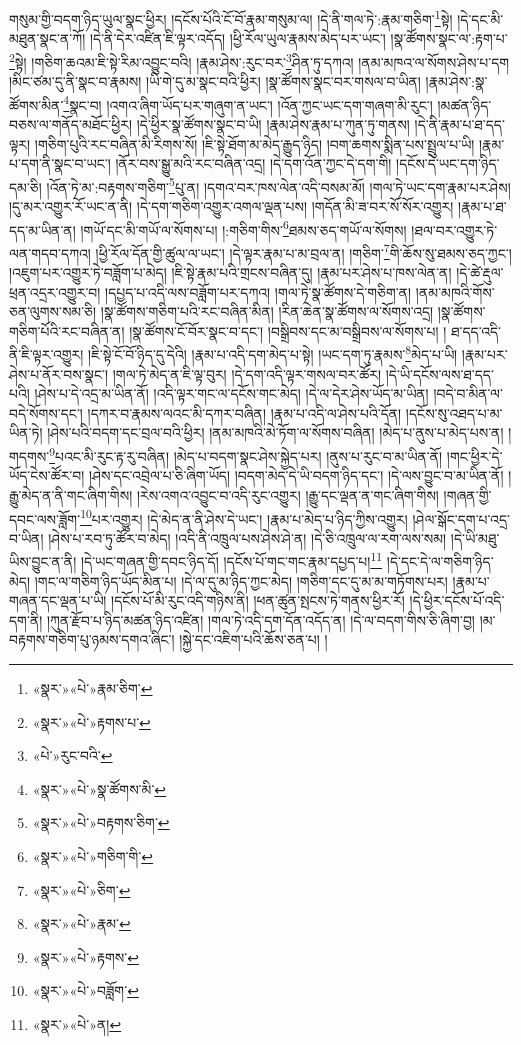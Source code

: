 གསུམ་གྱི་བདག་ཉིད་ཡུལ་སྣང་ཕྱིར། །དངོས་པོའི་ངོ་བོ་རྣམ་གསུམ་ལ། །དེ་ནི་གལ་ཏེ་:རྣམ་གཅིག་\footnote{«སྣར་»«པེ་»རྣམ་ཅིག་}སྟེ། །དེ་དང་མི་མཐུན་སྣང་ན་ཀོ། །དེ་ནི་དེར་འཛིན་ཇི་ལྟར་འདོད། །ཕྱི་རོལ་ཡུལ་རྣམས་མེད་པར་ཡང་། །སྣ་ཚོགས་སྣང་ལ་:རྟག་པ་\footnote{«སྣར་»«པེ་»རྟགས་པ་}སྟེ། །གཅིག་ཆའམ་ཇི་སྟེ་རིམ་འབྱུང་བའི། །རྣམ་ཤེས་:རུང་བར་\footnote{«པེ་»རུང་བའི་}ཤིན་ཏུ་དཀའ། །ནམ་མཁའ་ལ་སོགས་ཤེས་པ་དག །མིང་ཙམ་དུ་ནི་སྣང་བ་རྣམས། །ཡི་གེ་དུ་མ་སྣང་བའི་ཕྱིར། །སྣ་ཚོགས་སྣང་བར་གསལ་བ་ཡིན། །རྣམ་ཤེས་:སྣ་ཚོགས་མིན་\footnote{«སྣར་»«པེ་»སྣ་ཚོགས་མི་}སྣང་བ། །འགའ་ཞིག་ཡོད་པར་གཞུག་ན་ཡང་། །འོན་ཀྱང་ཡང་དག་གཞག་མི་རུང་། །མཚན་ཉིད་བཅས་ལ་གནོད་མཐོང་ཕྱིར། །དེ་ཕྱིར་སྣ་ཚོགས་སྣང་བ་ཡི། །རྣམ་ཤེས་རྣམ་པ་ཀུན་ཏུ་གནས། །དེ་ནི་རྣམ་པ་ཐ་དད་ལྟར། །གཅིག་པུའི་རང་བཞིན་མི་རིགས་སོ། །ཇི་སྟེ་ཐོག་མ་མེད་རྒྱུད་ཉིད། །བག་ཆགས་སྨིན་པས་སྤྲུལ་པ་ཡི། །རྣམ་པ་དག་ནི་སྣང་བ་ཡང་། །ནོར་བས་སྒྱུ་མའི་རང་བཞིན་འདྲ། །དེ་དག་འོན་ཀྱང་དེ་དག་གི། །དངོས་དེ་ཡང་དག་ཉིད་དམ་ཅི། །འོན་ཏེ་མ་:བརྟགས་གཅིག་\footnote{«སྣར་»«པེ་»བརྟགས་ཅིག་}པུ་ན། །དགའ་བར་ཁས་ལེན་འདི་བསམ་མོ། །གལ་ཏེ་ཡང་དག་རྣམ་པར་ཤེས། །དུ་མར་འགྱུར་རོ་ཡང་ན་ནི། །དེ་དག་གཅིག་འགྱུར་འགལ་ལྡན་པས། །གདོན་མི་ཟ་བར་སོ་སོར་འགྱུར། །རྣམ་པ་ཐ་དད་མ་ཡིན་ན། །གཡོ་དང་མི་གཡོ་ལ་སོགས་པ། །:གཅིག་གིས་\footnote{«སྣར་»«པེ་»གཅིག་གི་}ཐམས་ཅད་གཡོ་ལ་སོགས། །ཐལ་བར་འགྱུར་ཏེ་ལན་གདབ་དཀའ། །ཕྱི་རོལ་དོན་གྱི་ཚུལ་ལ་ཡང་། །དེ་ལྟར་རྣམ་པ་མ་བྲལ་ན། །གཅིག་\footnote{«སྣར་»«པེ་»ཅིག་}གི་ཆོས་སུ་ཐམས་ཅད་ཀྱང་། །འཇུག་པར་འགྱུར་ཏེ་བཟློག་པ་མེད། །ཇི་སྟེ་རྣམ་པའི་གྲངས་བཞིན་དུ། །རྣམ་པར་ཤེས་པ་ཁས་ལེན་ན། །དེ་ཚེ་རྡུལ་ཕྲན་འདྲར་འགྱུར་བ། །དཔྱད་པ་འདི་ལས་བཟློག་པར་དཀའ། །གལ་ཏེ་སྣ་ཚོགས་དེ་གཅིག་ན། །ནམ་མཁའི་གོས་ཅན་ལུགས་སམ་ཅི། །སྣ་ཚོགས་གཅིག་པའི་རང་བཞིན་མིན། །རིན་ཆེན་སྣ་ཚོགས་ལ་སོགས་འདྲ། །སྣ་ཚོགས་གཅིག་པོའི་རང་བཞིན་ན། །སྣ་ཚོགས་ངོ་བོར་སྣང་བ་དང་། །བསྒྲིབས་དང་མ་བསྒྲིབས་ལ་སོགས་པ། །
ཐ་དད་འདི་ནི་ཇི་ལྟར་འགྱུར། །ཇི་སྟེ་ངོ་བོ་ཉིད་དུ་དེའི། །རྣམ་པ་འདི་དག་མེད་པ་སྟེ། །ཡང་དག་ཏུ་རྣམས་\footnote{«སྣར་»«པེ་»རྣམ་}མེད་པ་ཡི། །རྣམ་པར་ཤེས་པ་ནོར་བས་སྣང་། །གལ་ཏེ་མེད་ན་ཇི་ལྟ་བུར། །དེ་དག་འདི་ལྟར་གསལ་བར་ཚོར། །དེ་ཡི་དངོས་ལས་ཐ་དད་པའི། །ཤེས་པ་དེ་འདྲ་མ་ཡིན་ནོ། །འདི་ལྟར་གང་ལ་དངོས་གང་མེད། །དེ་ལ་དེར་ཤེས་ཡོད་མ་ཡིན། །བདེ་བ་མིན་ལ་བདེ་སོགས་དང་། །དཀར་བ་རྣམས་ལའང་མི་དཀར་བཞིན། །རྣམ་པ་འདི་ལ་ཤེས་པའི་དོན། །དངོས་སུ་འཐད་པ་མ་ཡིན་ཏེ། །ཤེས་པའི་བདག་དང་བྲལ་བའི་ཕྱིར། །ནམ་མཁའི་མེ་ཏོག་ལ་སོགས་བཞིན། །མེད་པ་ནུས་པ་མེད་པས་ན། །གདགས་\footnote{«སྣར་»«པེ་»རྟགས་}པའང་མི་རུང་རྟ་རུ་བཞིན། །མེད་པ་བདག་སྣང་ཤེས་སྐྱེད་པར། །ནུས་པ་རུང་བ་མ་ཡིན་ནོ། །གང་ཕྱིར་དེ་ཡོད་ངེས་ཚོར་བ། །ཤེས་དང་འབྲེལ་པ་ཅི་ཞིག་ཡོད། །བདག་མེད་དེ་ཡི་བདག་ཉིད་དང་། །དེ་ལས་བྱུང་བ་མ་ཡིན་ནོ། །རྒྱུ་མེད་ན་ནི་གང་ཞིག་གིས། །རེས་འགའ་འབྱུང་བ་འདི་རུང་འགྱུར། །རྒྱུ་དང་ལྡན་ན་གང་ཞིག་གིས། །གཞན་གྱི་དབང་ལས་ཟློག་\footnote{«སྣར་»«པེ་»བཟློག་}པར་འགྱུར། །དེ་མེད་ན་ནི་ཤེས་དེ་ཡང་། །རྣམ་པ་མེད་པ་ཉིད་ཀྱིས་འགྱུར། །ཤེལ་སྒོང་དག་པ་འདྲ་བ་ཡིན། །ཤེས་པ་རབ་ཏུ་ཚོར་བ་མེད། །འདི་ནི་འཁྲུལ་པས་ཤེས་ཤེ་ན། །དེ་ཅི་འཁྲུལ་ལ་རག་ལས་སམ། །དེ་ཡི་མཐུ་ཡིས་བྱུང་ན་ནི། །དེ་ཡང་གཞན་གྱི་དབང་ཉིད་དོ། །དངོས་པོ་གང་གང་རྣམ་དཔྱད་པ།\footnote{«སྣར་»«པེ་»ན།} །དེ་དང་དེ་ལ་གཅིག་ཉིད་མེད། །གང་ལ་གཅིག་ཉིད་ཡོད་མིན་པ། །དེ་ལ་དུ་མ་ཉིད་ཀྱང་མེད། །གཅིག་དང་དུ་མ་མ་གཏོགས་པར། །རྣམ་པ་གཞན་དང་ལྡན་པ་ཡི། །དངོས་པོ་མི་རུང་འདི་གཉིས་ནི། །ཕན་ཚུན་སྤངས་ཏེ་གནས་ཕྱིར་རོ། །དེ་ཕྱིར་དངོས་པོ་འདི་དག་ནི། །ཀུན་རྫོབ་པ་ཉིད་མཚན་ཉིད་འཛིན། །གལ་ཏེ་འདི་དག་དོན་འདོད་ན། །དེ་ལ་བདག་གིས་ཅི་ཞིག་བྱ། །མ་བརྟགས་གཅིག་པུ་ཉམས་དགའ་ཞིང་། །སྐྱེ་དང་འཇིག་པའི་ཆོས་ཅན་པ། །
